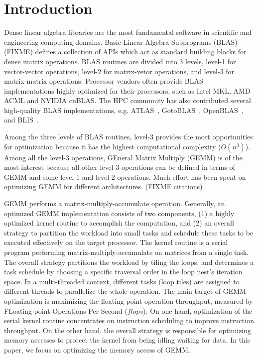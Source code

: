 \section{Introduction}\label{sec:intro}
Dense linear algebra libraries are the most fundamental software in
scientific and engineering computing domains.
Basic Linear Algebra Subprograms (BLAS) (FIXME) defines a collection
of APIs which act as standard building blocks for dense matrix operations.
BLAS routines are divided into 3 levels,
level-1 for vector-vector operations,
level-2 for matrix-vetor operations,
and level-3 for matrix-matrix operations.
Processor vendors often provide BLAS implementations
highly optimized for their processors,
such as Intel MKL, AMD ACML and NVIDIA cuBLAS.
The HPC community has also contributed several high-quality
BLAS implementations, e.g. ATLAS~\cite{atlas},
GotoBLAS~\cite{gotoblas}, OpenBLAS~\cite{openblas},
and BLIS~\cite{blis}\cite{blisport}.

Among the three levels of BLAS routines, level-3 provides the most opportunities
for optimization because it has the highest computational complexity ($O(n^3)$).
Among all the level-3 operations, GEneral Matrix Multiply (GEMM) is
of the most interest because all other level-3 operations can be defined
in terms of GEMM and some level-1 and level-2 operations.
Much effort has been spent on optimizing GEMM for different architectures.
(FIXME citations)

GEMM performs a matrix-multiply-accumulate operation.
Generally, an optimized GEMM implementation consists of two components,
(1) a highly optimized kernel routine to accomplish the computation, and
(2) an overall strategy to partition the workload into small tasks
and schedule these tasks to be executed effectively on the target processor.
The kernel routine is a serial program performing matrix-multiply-accumulate
on matrices from a single task.
The overall strategy partitions the workload by tiling the loops,
and determines a task schedule by choosing a specific traversal order
in the loop nest's iteration space.
In a multi-threaded context, different tasks (loop tiles) are assigned to
different threads to parallelize the whole operation.
The main target of GEMM optimization is maximizing the floating-point
operation throughput, measured by FLoating-point Operations Per Second ($flops$).
On one hand, optimization of the serial kernel routine concentrates on
instruction scheduling to improve instruction throughput.
On the other hand, the overall strategy is responsible for optimizing
memory accesses to protect the kernel from being idling waiting for data.
In this paper, we focus on optimizing the memory access of GEMM.

